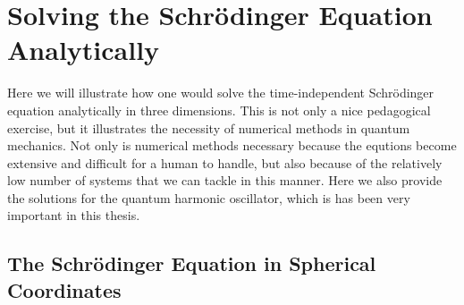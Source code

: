 \chapter{Solving the Schrödinger Equation Analytically}
\label{app:analytical_tise}

Here we will illustrate how one would solve the time-independent Schrödinger
equation analytically in three dimensions. This is not only a nice pedagogical exercise,
but it illustrates the necessity of numerical methods in quantum mechanics. 
Not only is numerical methods necessary because the equtions become extensive and 
difficult for a human to handle, but also because of the relatively low number 
of systems that we can tackle in this manner. Here we also provide the 
solutions for the quantum harmonic oscillator, which is has been very important 
in this thesis.

\section{The Schrödinger Equation in Spherical Coordinates}

